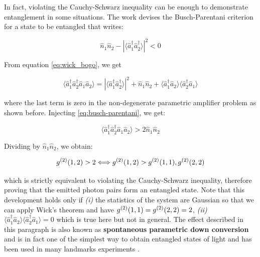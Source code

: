 
In fact, violating the Cauchy-Schwarz inequality can be enough to demonstrate entanglement in some situations. The work \cite{busch2014quantum} devises the Busch-Parentani criterion for a state to be entangled that writes:

\begin{equation}
    \hat{n}_1 \hat{n}_2 - | \langle \hat{a}^{\dagger}_{1} \hat{a}^{\dagger}_{2} \rangle |^2 < 0
    \label{eq:busch-parentani}
\end{equation}

\noindent From equation \ref{eq:wick_bogo}, we get

\begin{equation}
    \langle \hat{a}^{\dagger}_{1} \hat{a}^{\dagger}_{2} \hat{a}_{1} \hat{a}_{2} \rangle = | \langle \hat{a}^{\dagger}_{1} \hat{a}^{\dagger}_{2} \rangle |^2 + \hat{n}_1 \hat{n}_2 + \langle \hat{a}^{\dagger}_{1} \hat{a}_{2} \rangle \langle \hat{a}^{\dagger}_{2} \hat{a}_{1} \rangle
\end{equation}

\noindent where the last term is zero in the non-degenerate parametric amplifier problem as shown before. Injecting \ref{eq:busch-parentani}, we get:

\begin{equation}
    \langle \hat{a}^{\dagger}_{1} \hat{a}^{\dagger}_{2} \hat{a}_{1} \hat{a}_{2} \rangle > 2 \hat{n}_1 \hat{n}_2
\end{equation}

\noindent Dividing by  $\hat{n}_1 \hat{n}_2$, we obtain:

\begin{equation}
    g^{(2)} (1,2) > 2 \Longleftrightarrow g^{(2)} (1,2) > g^{(2)} (1,1), g^{(2)} (2,2)
\end{equation}

\noindent which is strictly equivalent to violating the Cauchy-Schwarz inequality, therefore proving that the emitted photon pairs form an entangled state. Note that this development holds only if \textit{(i)} the statistics of the system are Gaussian so that we can apply Wick's theorem and have $g^{(2)} (1,1)=g^{(2)} (2,2)=2$, \textit{(ii)} $\langle \hat{a}^{\dagger}_{1} \hat{a}_{2} \rangle \langle \hat{a}^{\dagger}_{2} \hat{a}_{1} \rangle = 0$ which is true here but not in general. The effect described in this paragraph is also known as \textbf{spontaneous parametric down conversion} and is in fact one of the simplest way to obtain entangled states of light and has been used in many landmarks experiments \cite{burnham1970,heidmann1987observation,rarity1990experimental}.

